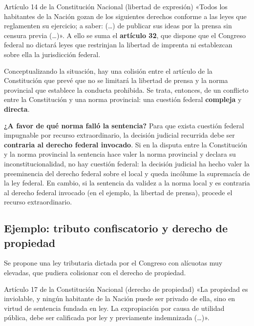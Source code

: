 \documentclass[12pt,oneside]{book}
\begin{document}
\begin{norma}{Artículo 14 de la Constitución Nacional (libertad de expresión)}
«Todos los habitantes de la Nación gozan de los siguientes derechos conforme a las leyes que reglamenten su ejercicio; a saber: (\ldots) de publicar sus ideas por la prensa sin censura previa (\ldots)». A ello se suma el \textbf{artículo 32}, que dispone que el Congreso federal no dictará leyes que restrinjan la libertad de imprenta ni establezcan sobre ella la jurisdicción federal.
\end{norma}

Conceptualizando la situación, hay una colisión entre el artículo de la Constitución que prevé que no se limitará la libertad de prensa y la norma provincial que establece la conducta prohibida. Se trata, entonces, de un conflicto entre la Constitución y una norma provincial: una cuestión federal \textbf{compleja} y \textbf{directa}.

\begin{important}
\textbf{¿A favor de qué norma falló la sentencia?} Para que exista cuestión federal impugnable por recurso extraordinario, la decisión judicial recurrida debe ser \textbf{contraria al derecho federal invocado}. Si en la disputa entre la Constitución y la norma provincial la sentencia hace valer la norma provincial y declara su inconstitucionalidad, no hay cuestión federal: la decisión judicial ha hecho valer la preeminencia del derecho federal sobre el local y queda incólume la supremacía de la ley federal. En cambio, si la sentencia da validez a la norma local y es contraria al derecho federal invocado (en el ejemplo, la libertad de prensa), procede el recurso extraordinario.
\end{important}

\subsection{Ejemplo: tributo confiscatorio y derecho de propiedad}

Se propone una ley tributaria dictada por el Congreso con alícuotas muy elevadas, que pudiera colisionar con el derecho de propiedad.

\begin{norma}{Artículo 17 de la Constitución Nacional (derecho de propiedad)}
«La propiedad es inviolable, y ningún habitante de la Nación puede ser privado de ella, sino en virtud de sentencia fundada en ley. La expropiación por causa de utilidad pública, debe ser calificada por ley y previamente indemnizada (\ldots)».
\end{norma}
\end{document}
